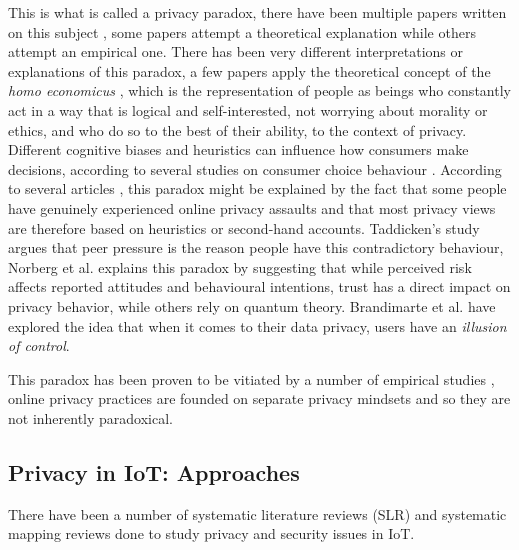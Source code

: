 This is what is called a privacy paradox, there have been multiple papers
written on this subject \cite{solove2021myth, WilliamsPrivacy, lee2021investigating, goad2021privacy, gerber2018explaining},
some papers attempt a theoretical explanation while others attempt an empirical
one. There has been very different interpretations or explanations of this
paradox, a few papers \cite{wilson2012unpacking, warshaw2015can, lee2015privacy}
apply the theoretical concept of the \textit{homo economicus} \cite{zak2008moral},
which is the representation of people as beings who constantly act in a
way that is logical and self-interested, not worrying about morality or
ethics, and who do so to the best of their ability, to the context of privacy.
Different cognitive biases and heuristics can influence how consumers make
decisions, according to several studies on consumer choice behaviour \cite{acquisti2007can, knijnenburg2013dimensionality, wakefield2013influence, flender2012type}.
According to several articles \cite{dienlin2015privacy, baek2014solving},
this paradox might be explained by the fact that some people have genuinely
experienced online privacy assaults and that most privacy views are therefore
based on heuristics or second-hand accounts. Taddicken's study \cite{taddicken2014privacy}
argues that peer pressure is the reason people have this contradictory behaviour,
Norberg et al. \cite{norberg2007privacy} explains this paradox by suggesting
that while perceived risk affects reported attitudes and behavioural intentions,
trust has a direct impact on privacy behavior, while others \cite{flender2012type, kokolakis2017privacy}
rely on quantum theory. Brandimarte et al. \cite{brandimarte2013misplaced}
have explored the idea that when it comes to their data privacy, users have
an \textit{illusion of control}.

This paradox has been proven to be vitiated by a number of empirical studies \cite{dienlin2015privacy, xie2019consumers, SCHWAIG20131, sannon2018privacy},
online privacy practices are founded on separate privacy mindsets and so
they are not inherently paradoxical.

\subsection{Privacy in IoT: Approaches}

There have been a number of systematic literature reviews (SLR) \cite{Gupta2022Privacy, Kuhtreiber2022survey, sicari2015security, LinSurvey}
and systematic mapping reviews \cite{porras2018security, ahmed2019aspects}
done to study privacy and security issues in IoT.

